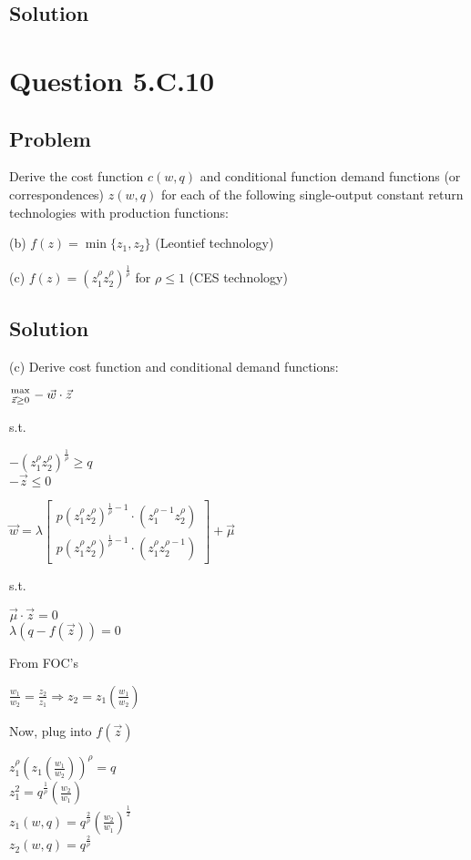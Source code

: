 \documentclass[10pt, a4paper]{article}
\begin{document}
    \subsection{Solution}
      
  \section{Question 5.C.10}
    \subsection{Problem}
      Derive the cost function $c(w,q)$ and conditional function demand functions (or correspondences) $z(w,q)$ for each of the following single-output constant return technologies with production functions:

      (b) $f(z)=\min\{z_1,z_2\}$ (Leontief technology)

      (c) $f(z)=(z_1^{\rho}z_2^{\rho})^{\frac{1}{\rho}}$ for $\rho\leq1$ (CES technology) 
    \subsection{Solution}
      (c) Derive cost function and conditional demand functions:
      \begin{center}
        ${\max \atop{\vec{z}\geq0}} -\vec{w}\cdot\vec{z}$ \\
      \end{center}
      s.t.
      \begin{center}
        $-(z_1^{\rho}z_2^{\rho})^{\frac{1}{\rho}}\geq q$ \\
        $-\vec{z}\leq0$
      \end{center}
      
      \begin{center}
        $\vec{w}=\lambda\begin{bmatrix} p(z_1^{\rho}z_2^{\rho})^{\frac{1}{\rho}-1}\cdot(z_1^{\rho-1}z_2^{\rho}) \\ 
        p(z_1^{\rho}z_2^{\rho})^{\frac{1}{\rho}-1}\cdot(z_1^{\rho}z_2^{\rho-1}) \end{bmatrix} + \vec{\mu}$
      \end{center}
      s.t. 
      \begin{center}
        $\vec{\mu}\cdot\vec{z}=0$ \\
        $\lambda(q-f(\vec{z}))=0$
      \end{center}
      From FOC's
      \begin{center}
        $\frac{w_1}{w_2}=\frac{z_2}{z_1}\Rightarrow z_2=z_1(\frac{w_1}{w_2})$
      \end{center}
      Now, plug into $f(\vec{z})$
      \begin{center}
        $z_1^{\rho}(z_1(\frac{w_1}{w_2}))^{\rho}=q$ \\
        $z_1^2 = q^{\frac{1}{\rho}}(\frac{w_2}{w_1})$ \\
        $z_1(w,q) = q^{\frac{2}{\rho}}(\frac{w_2}{w_1})^{\frac{1}{2}}$ \\
        $z_2(w,q) = q^{\frac{2}{\rho}}$
      \end{center}
\end{document}
